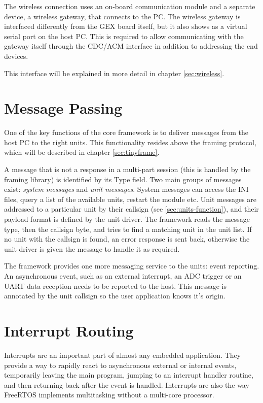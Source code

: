 The wireless connection uses an on-board communication module and a separate device, a wireless gateway, that connects to the PC. The wireless gateway is interfaced differently from the GEX board itself, but it also shows as a virtual serial port on the host PC. This is required to allow communicating with the gateway itself through the CDC/ACM interface in addition to addressing the end devices.

This interface will be explained in more detail in chapter \ref{sec:wireless}.

\section{Message Passing} \label{sec:message_passing}

One of the key functions of the core framework is to deliver messages from the host PC to the right units. This functionality resides above the framing protocol, which will be described in chapter \ref{sec:tinyframe}.

A message that is not a response in a multi-part session (this is handled by the framing library) is identified by its Type field. Two main groups of messages exist: \textit{system messages} and \textit{unit messages}. System messages can access the INI files, query a list of the available units, restart the module etc. Unit messages are addressed to a particular unit by their callsign (see \ref{sec:units-function}), and their payload format is defined by the unit driver. The framework reads the message type, then the callsign byte, and tries to find a matching unit in the unit list. If no unit with the callsign is found, an error response is sent back, otherwise the unit driver is given the message to handle it as required.

The framework provides one more messaging service to the units: event reporting. An asynchronous event, such as an external interrupt, an ADC trigger or an UART data reception needs to be reported to the host. This message is annotated by the unit callsign so the user application knows it's origin.


\section{Interrupt Routing} \label{sec:irq-routing}

Interrupts are an important part of almost any embedded application. They provide a way to rapidly react to asynchronous external or internal events, temporarily leaving the main program, jumping to an interrupt handler routine, and then returning back after the event is handled. Interrupts are also the way FreeRTOS implements multitasking without a multi-core processor.

